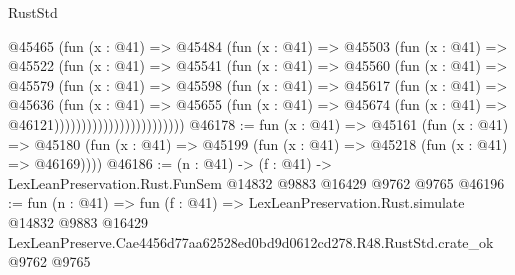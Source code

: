\begin{lexlean}{RustStd}
\begin{coremodule}
                          @45465
                            (fun (x : @41) =>
                            @45484
                              (fun (x : @41) =>
                              @45503
                                (fun (x : @41) =>
                                @45522
                                  (fun (x : @41) =>
                                  @45541
                                    (fun (x : @41) =>
                                    @45560
                                      (fun (x : @41) =>
                                      @45579
                                        (fun (x : @41) =>
                                        @45598
                                          (fun (x : @41) =>
                                          @45617
                                            (fun (x : @41) =>
                                            @45636
                                              (fun (x : @41) =>
                                              @45655
                                                (fun (x : @41) =>
                                                @45674
                                                  (fun (x : @41) => @46121))))))))))))))))))))))))
@46178 := fun (x : @41) =>
  @45161
    (fun (x : @41) =>
    @45180 (fun (x : @41) => @45199 (fun (x : @41) => @45218 (fun (x : @41) => @46169))))
@46186 := (n : @41) -> (f : @41) -> LexLeanPreservation.Rust.FunSem @14832 @9883 @16429 @9762 @9765
@46196 := fun (n : @41) =>
  fun (f : @41) =>
  LexLeanPreservation.Rust.simulate
    @14832
    @9883
    @16429
    LexLeanPreserve.Cae4456d77aa62528ed0bd9d0612cd278.R48.RustStd.crate_ok
    @9762
    @9765
\end{coremodule}
\end{lexlean}
